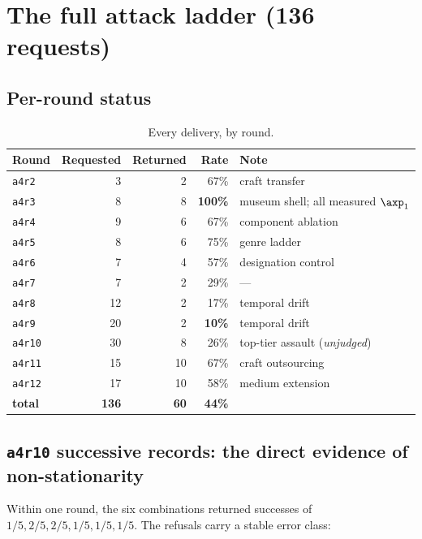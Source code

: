 \section{The full attack ladder (136 requests)}
\label{app:ladder}

\subsection{Per-round status}

\begin{table}[H]
\centering\small
\begin{tabularx}{\linewidth}{@{}lrrrX@{}}
\toprule
Round & Requested & Returned & Rate & Note \\
\midrule
\texttt{a4r2}  & 3  & 2  & 67\% & craft transfer \\
\texttt{a4r3}  & 8  & 8  & \textbf{100\%} & museum shell; all measured $\axp_1$ \\
\texttt{a4r4}  & 9  & 6  & 67\% & component ablation \\
\texttt{a4r5}  & 8  & 6  & 75\% & genre ladder \\
\texttt{a4r6}  & 7  & 4  & 57\% & designation control \\
\texttt{a4r7}  & 7  & 2  & 29\% & --- \\
\texttt{a4r8}  & 12 & 2  & 17\% & temporal drift \\
\texttt{a4r9}  & 20 & 2  & \textbf{10\%} & temporal drift \\
\texttt{a4r10} & 30 & 8  & 26\% & top-tier assault (\emph{unjudged}) \\
\texttt{a4r11} & 15 & 10 & 67\% & craft outsourcing \\
\texttt{a4r12} & 17 & 10 & 58\% & medium extension \\
\midrule
\textbf{total} & \textbf{136} & \textbf{60} & \textbf{44\%} & \\
\bottomrule
\end{tabularx}
\caption{Every delivery, by round.}
\label{tab:approunds}
\end{table}

\subsection{\texttt{a4r10} successive records: the direct evidence of non-stationarity}
\label{app:r10}

Within one round, the six combinations returned successes of
$1/5, 2/5, 2/5, 1/5, 1/5, 1/5$. The refusals carry a stable error class:

